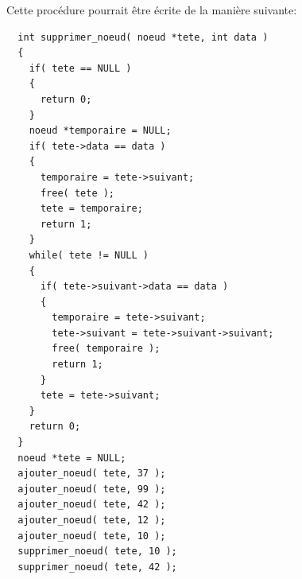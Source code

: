 \documentclass[11pt]{article}
\begin{document}
Cette procédure pourrait être écrite de la manière suivante:
\begin{lstlisting}
  int supprimer_noeud( noeud *tete, int data )
  {
    if( tete == NULL )
    {
      return 0;
    }
    noeud *temporaire = NULL;
    if( tete->data == data )
    {
      temporaire = tete->suivant;
      free( tete );
      tete = temporaire;
      return 1;
    }
    while( tete != NULL )
    {
      if( tete->suivant->data == data )
      {
        temporaire = tete->suivant;
        tete->suivant = tete->suivant->suivant;
        free( temporaire );
        return 1;
      }
      tete = tete->suivant;
    }
    return 0;
  }
  noeud *tete = NULL;
  ajouter_noeud( tete, 37 );
  ajouter_noeud( tete, 99 );
  ajouter_noeud( tete, 42 );
  ajouter_noeud( tete, 12 );
  ajouter_noeud( tete, 10 );
  supprimer_noeud( tete, 10 );
  supprimer_noeud( tete, 42 );
\end{lstlisting}
\end{document}
